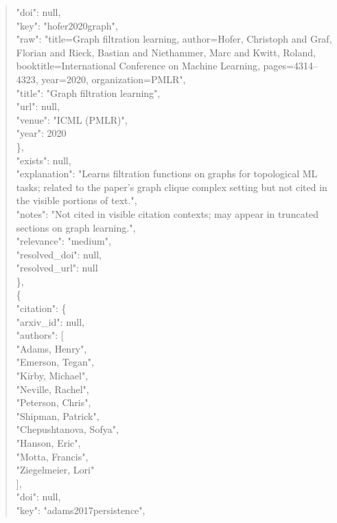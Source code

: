\documentclass[11pt]{article}
\begin{document}
\begin{quote}
        "doi": null,\\
        "key": "hofer2020graph",\\
        "raw": "title=Graph filtration learning, author=Hofer, Christoph and Graf, Florian and Rieck, Bastian and Niethammer, Marc and Kwitt, Roland, booktitle=International Conference on Machine Learning, pages=4314--4323, year=2020, organization=PMLR",\\
        "title": "Graph filtration learning",\\
        "url": null,\\
        "venue": "ICML (PMLR)",\\
        "year": 2020\\
      \},\\
      "exists": null,\\
      "explanation": "Learns filtration functions on graphs for topological ML tasks; related to the paper's graph clique complex setting but not cited in the visible portions of text.",\\
      "notes": "Not cited in visible citation contexts; may appear in truncated sections on graph learning.",\\
      "relevance": "medium",\\
      "resolved\_doi": null,\\
      "resolved\_url": null\\
    \},\\
    \{\\
      "citation": \{\\
        "arxiv\_id": null,\\
        "authors": [\\
          "Adams, Henry",\\
          "Emerson, Tegan",\\
          "Kirby, Michael",\\
          "Neville, Rachel",\\
          "Peterson, Chris",\\
          "Shipman, Patrick",\\
          "Chepushtanova, Sofya",\\
          "Hanson, Eric",\\
          "Motta, Francis",\\
          "Ziegelmeier, Lori"\\
        ],\\
        "doi": null,\\
        "key": "adams2017persistence",\\

\end{quote}
\end{document}

